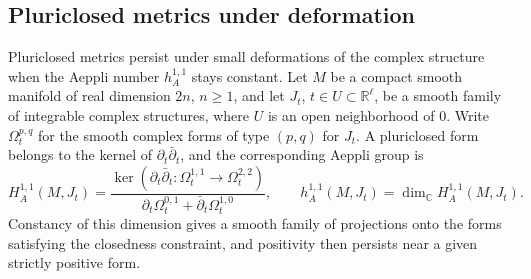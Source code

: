 \subsection{Pluriclosed metrics under deformation}
\label{sec:pluriclosed-deformations}

Pluriclosed metrics persist under small deformations of the complex structure when the Aeppli number $h_A^{1,1}$ stays constant. Let $M$ be a compact smooth manifold of real dimension $2n$, $n\geq1$, and let $J_t$, $t\in U\subset\mathbb R^\ell$, be a smooth family of integrable complex structures, where $U$ is an open neighborhood of $0$. Write $\Omega_t^{p,q}$ for the smooth complex forms of type $(p,q)$ for $J_t$. A pluriclosed form belongs to the kernel of $\partial_t\bar\partial_t$, and the corresponding Aeppli group is
\[
 H_A^{1,1}(M,J_t)
 =\frac{\ker(\partial_t\bar\partial_t\colon\Omega_t^{1,1}\to\Omega_t^{2,2})}
 {\partial_t\Omega_t^{0,1}+\bar\partial_t\Omega_t^{1,0}},
 \qquad h_A^{1,1}(M,J_t)=\dim_{\mathbb C}H_A^{1,1}(M,J_t).
\]
Constancy of this dimension gives a smooth family of projections onto the forms satisfying the closedness constraint, and positivity then persists near a given strictly positive form.

